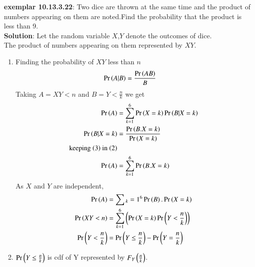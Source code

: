 \documentclass[journal,12pt,onecolumn]{IEEEtran}
\begin{document}
 \bigskip 
 \renewcommand{\thefigure}{\theenumi} 
 \renewcommand{\thetable}{\theenumi} 
 \textbf{exemplar 10.13.3.22}: 
 Two dice are thrown at the same time and the product of numbers appearing on them are noted.Find the probability that the product is less than 9. \\ 
 \textbf{Solution}: 
         Let the random variable  $X$,$Y$ denote the outcomes of dice. \\
	 The product of numbers appearing on them represented by $XY$. \\
 \begin{enumerate}[label=(\alph*)]
		 \begin{table}[htpb]
			 \centering
			 \caption{Events and their probabilities}
			 \label{tab:dice_probabilities}
			 
		 \end{table}
	 \item   Finding the probability of $XY$ less than $n$ 
                         \begin{align} 
				 \Pr\left(A|B\right) &= \frac{\Pr\left(AB\right)}{B} 
			 \end{align}
				 Taking $A=XY < n$ and $B=Y < \frac{n}{k}$ we get \\
				 \begin{align}
				 \Pr\left(A\right) &= \sum_{k=1}^{6}\Pr\left(X=k\right)\Pr\left(B|X=k\right) \\
				 \Pr\left(B|X=k\right) &= \frac{\Pr\left(B.X=k\right)}{\Pr\left(X=k\right)} \\
				 \text{keeping $\left(3\right)$ in $\left(2\right)$} \\
				 \Pr\left(A\right) &= \sum_{k=1}^{6}\Pr\left(B.X=k\right)
                         \end{align} 
		 As $X$ and $Y$ are independent,
			 \begin{align}
				 \Pr\left(A\right) &= \sum{_k=1}^{6}\Pr\left(B\right).\Pr\left(X=k\right) \\
				 \Pr\left(XY < n\right) &= \sum_{k=1}^{6}\left(\Pr\left(X=k\right)\Pr\left(Y < \frac{n}{k}\right)\right) \\
                                 \Pr\left(Y < \frac{n}{k}\right) &= \Pr\left(Y \leq \frac{n}{k}\right) - \Pr\left(Y = \frac{n}{k}\right)
			 \end{align}
			 \item $\Pr\left(Y \leq \frac{n}{k}\right)$ is cdf of Y represented by $F_Y\left(\frac{n}{k}\right)$.\\

\end{enumerate}
\end{document}
